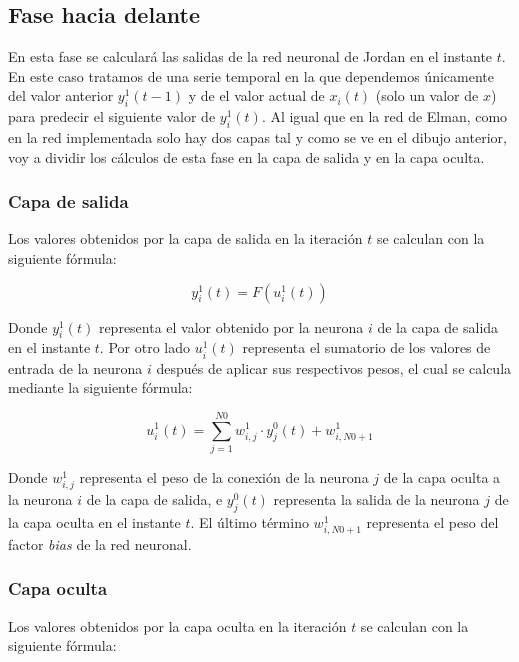 \documentclass[a4paper,11pt]{article}
\begin{document}
\subsection{Fase hacia delante}
En esta fase se calculará las salidas de la red neuronal de Jordan en el instante ${t}$. En este caso tratamos de una serie temporal en la que dependemos únicamente del valor anterior ${y_{i}^{1}(t-1)}$ y de el valor actual de ${x_{i}(t)}$ (solo un valor de ${x}$) para predecir el siguiente valor de ${y_{i}^{1}(t)}$. Al igual que en la red de Elman, como en la red implementada solo hay dos capas tal y como se ve en el dibujo anterior, voy a dividir los cálculos de esta fase en la capa de salida y en la capa oculta.

\subsubsection{Capa de salida}
Los valores obtenidos por la capa de salida en la iteración ${t}$ se calculan con la siguiente fórmula:

\begin{equation}
	\label{jordan_salida_y}
	y_{i}^{1}(t) = F\left(u_{i}^{1}(t)\right)
\end{equation}

Donde ${y_{i}^{1}(t)}$ representa el valor obtenido por la neurona ${i}$ de la capa de salida en el instante ${t}$. Por otro lado ${u_{i}^{1}(t)}$ representa el sumatorio de los valores de entrada de la neurona ${i}$ después de aplicar sus respectivos pesos, el cual se calcula mediante la siguiente fórmula:

\begin{equation}
	\label{jordan_salida_u}
	u_{i}^{1}(t) = \sum_{j=1}^{N0}{w_{i,j}^{1} \cdot y_{j}^{0}(t)} + w_{i,N0+1}^{1}
\end{equation}

Donde ${w_{i,j}^{1}}$ representa el peso de la conexión de la neurona ${j}$ de la capa oculta a la neurona ${i}$ de la capa de salida, e ${y_{j}^{0}(t)}$ representa la salida de la neurona ${j}$ de la capa oculta en el instante ${t}$. El último término ${w_{i,N0+1}^{1}}$ representa el peso del factor \textit{bias} de la red neuronal.

\subsubsection{Capa oculta}
Los valores obtenidos por la capa oculta en la iteración ${t}$ se calculan con la siguiente fórmula:
\end{document}
